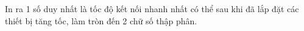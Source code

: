 In ra 1 số duy nhất là tốc độ kết nối nhanh nhất có thể sau khi đã lắp đặt các thiết bị tăng tốc, làm tròn đến 2 chữ số thập phân.